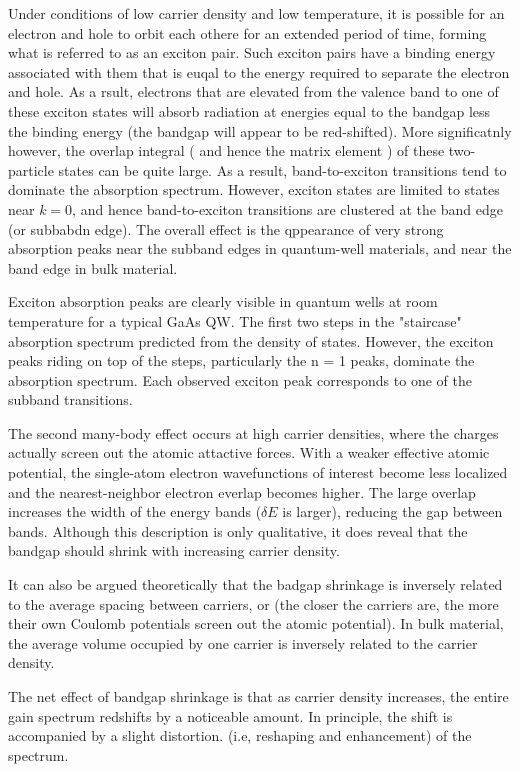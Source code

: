 Under conditions of low carrier density and low temperature, it is possible for
an electron and hole to orbit each othere for an extended period of time,
forming what is referred to as an exciton pair. Such exciton pairs have a
binding energy associated with them that is euqal to the energy required to
separate the electron and hole. As a rsult, electrons that are elevated from
the valence band to one of these exciton states will absorb radiation at
energies equal to the bandgap less the binding energy (the bandgap will appear
to be red-shifted). More significatnly however, the overlap integral ( and
hence the matrix element ) of these two-particle states can be quite large. As
a result, band-to-exciton transitions tend to dominate the absorption spectrum.
However, exciton states are limited to states near $k = 0$, and hence
band-to-exciton transitions are clustered at the band edge (or subbabdn edge).
The overall effect is the qppearance of very strong absorption peaks near the
subband edges in quantum-well materials, and near the band edge in bulk
material.

Exciton absorption peaks are clearly visible in quantum wells at room
temperature for a typical GaAs QW. The first two steps in the "staircase"
absorption spectrum predicted from the density of states. However, the exciton
peaks riding on top of the steps, particularly the n = 1 peaks, dominate the
absorption spectrum. Each observed exciton peak corresponds to one of the
subband transitions.

The second many-body effect occurs at high carrier densities, where the charges
actually screen out the atomic attactive forces. With a weaker effective atomic
potential, the single-atom electron wavefunctions of interest become less
localized and the nearest-neighbor electron everlap becomes higher.  The large
overlap increases the width of the energy bands ($\delta{E}$ is larger),
reducing the gap between bands. Although this description is only qualitative,
it does reveal that the bandgap should shrink with increasing carrier density.

It can also be argued theoretically that the badgap shrinkage is inversely
related to the average spacing between carriers, or (the closer the carriers
are, the more their own Coulomb potentials screen out the atomic potential). In
bulk material, the average volume occupied by one carrier is inversely related
to the carrier density. 

The net effect of bandgap shrinkage is that as carrier density increases, the
entire gain spectrum redshifts by a noticeable amount. In principle, the shift
is accompanied by a slight distortion. (i.e, reshaping and enhancement) of the
spectrum.

